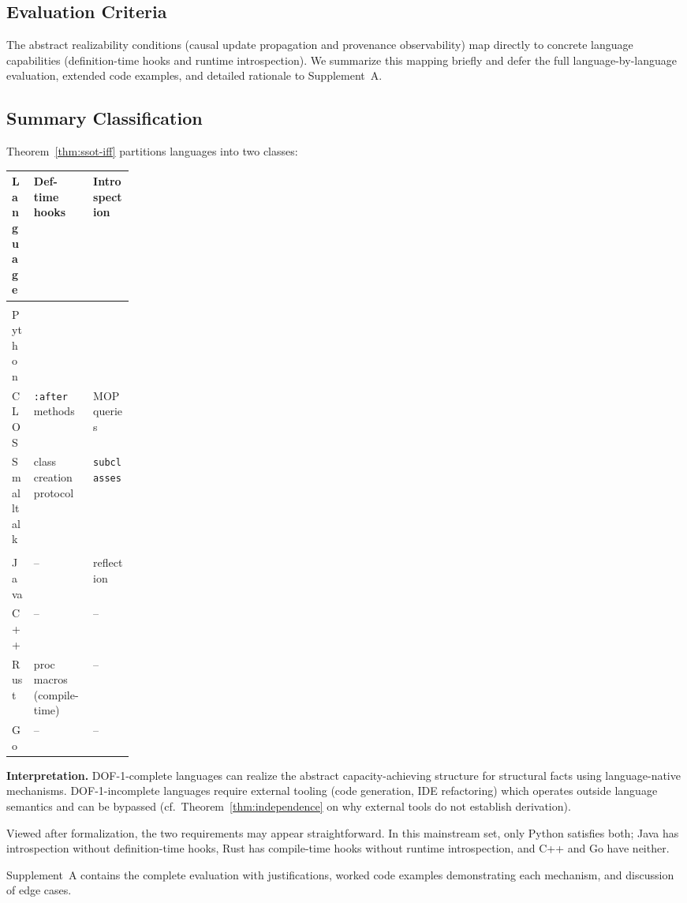 \subsection{Evaluation Criteria}\label{sec:criteria}

The abstract realizability conditions (causal update propagation and provenance observability) map directly to concrete language capabilities (definition-time hooks and runtime introspection). We summarize this mapping briefly and defer the full language-by-language evaluation, extended code examples, and detailed rationale to Supplement~A.

\subsection{Summary Classification}\label{sec:classification-summary}

Theorem~\ref{thm:ssot-iff} partitions languages into two classes:

\begin{center}
\small
\setlength{\tabcolsep}{3pt}
\begin{tabularx}{\linewidth}{@{}>{\RaggedRight\arraybackslash}p{0.18\linewidth}YY@{}}
\toprule
\textbf{Language} & \textbf{Def-time hooks} & \textbf{Introspection} \\
\midrule
{} \\
Python &  &  \\
CLOS & \texttt{:after} methods & MOP queries \\
Smalltalk & class creation protocol & \texttt{subclasses} \\
\midrule
{} \\
Java & -- & reflection \\
C++ & -- & -- \\
Rust & proc macros (compile-time) & -- \\
Go & -- & -- \\
\bottomrule
\end{tabularx}
\end{center}

\textbf{Interpretation.} DOF-1-complete languages can realize the abstract capacity-achieving structure for structural facts using language-native mechanisms. DOF-1-incomplete languages require external tooling (code generation, IDE refactoring) which operates outside language semantics and can be bypassed (cf.\ Theorem~\ref{thm:independence} on why external tools do not establish derivation).

Viewed after formalization, the two requirements may appear straightforward. In this mainstream set, only Python satisfies both; Java has introspection without definition-time hooks, Rust has compile-time hooks without runtime introspection, and C++ and Go have neither.

Supplement~A contains the complete evaluation with justifications, worked code examples demonstrating each mechanism, and discussion of edge cases.
